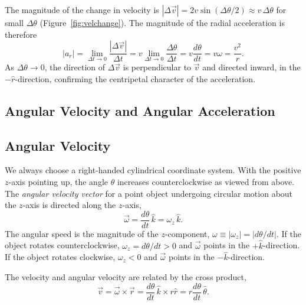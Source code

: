 The magnitude of the change in velocity is $|\Delta\vec{v}| = 2v\sin(\Delta\theta/2) \approx v\,\Delta\theta$ for small $\Delta\theta$ (Figure~\ref{fig:velchange}). The magnitude of the radial acceleration is therefore
\begin{equation}
    |a_r| = \lim_{\Delta t\to 0}\frac{|\Delta\vec{v}|}{\Delta t} = v\lim_{\Delta t\to 0}\frac{\Delta\theta}{\Delta t} = v\frac{d\theta}{dt} = v\omega = \frac{v^2}{r}.
\end{equation}
As $\Delta\theta\to 0$, the direction of $\Delta\vec{v}$ is perpendicular to $\vec{v}$ and directed inward, in the $-\hat{r}$-direction, confirming the centripetal character of the acceleration.

\subsection{Angular Velocity and Angular Acceleration}

\subsection{Angular Velocity}

We always choose a right-handed cylindrical coordinate system. With the positive $z$-axis pointing up, the angle $\theta$ increases counterclockwise as viewed from above. The \textit{angular velocity vector} for a point object undergoing circular motion about the $z$-axis is directed along the $z$-axis,
\begin{equation}
    \vec{\omega} = \frac{d\theta}{dt}\,\hat{k} = \omega_z\,\hat{k}.
\end{equation}
The angular speed is the magnitude of the $z$-component, $\omega \equiv |\omega_z| = |d\theta/dt|$. If the object rotates counterclockwise, $\omega_z = d\theta/dt > 0$ and $\vec{\omega}$ points in the $+\hat{k}$-direction. If the object rotates clockwise, $\omega_z < 0$ and $\vec{\omega}$ points in the $-\hat{k}$-direction.

The velocity and angular velocity are related by the cross product,
\begin{equation}
    \vec{v} = \vec{\omega}\times\vec{r} = \frac{d\theta}{dt}\,\hat{k}\times r\hat{r} = r\frac{d\theta}{dt}\,\hat{\theta}.
\end{equation}

